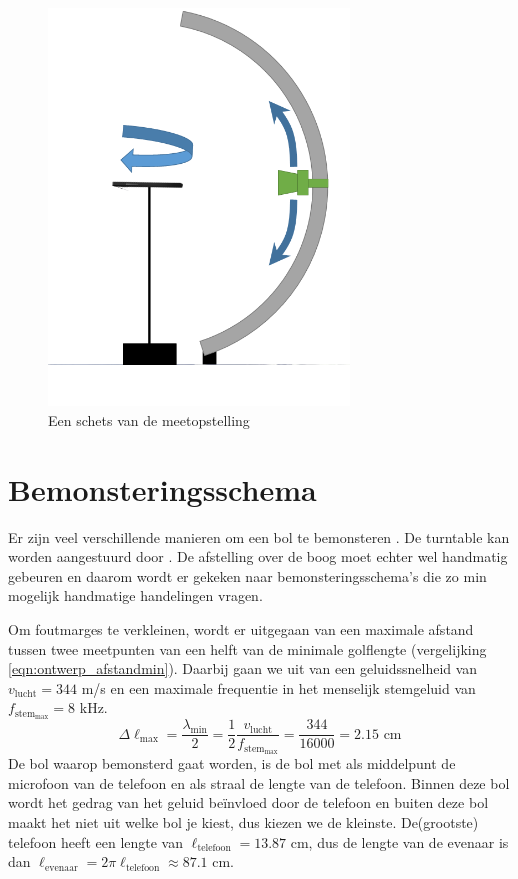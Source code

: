 \begin{figure}[h]
    \centering
    \includegraphics[width=8cm]{afbeeldingen/opstelling_pptx.png}
    \caption{Een schets van de meetopstelling}
    \label{fig:opstelling_pptx}
\end{figure}

\section{Bemonsteringsschema}
Er zijn veel verschillende manieren om een bol te bemonsteren \cite{Zhang2012575}.
De turntable kan worden aangestuurd door \matlab.
De afstelling over de boog moet echter wel handmatig gebeuren en daarom wordt er gekeken naar bemonsteringsschema's die zo min mogelijk handmatige handelingen vragen.

Om foutmarges te verkleinen, wordt er uitgegaan van een maximale afstand tussen twee meetpunten van een helft van de minimale golflengte (vergelijking \ref{eqn:ontwerp_afstandmin}).
Daarbij gaan we uit van een geluidssnelheid van $v_\text{lucht}=344$ m/s en een maximale frequentie in het menselijk stemgeluid van $f_{\text{stem}_\text{max}}=8$ kHz.
\begin{equation}
\label{eqn:ontwerp_afstandmin}
\Delta\ell_\text{max}=\dfrac{\lambda_\text{min}}{2}=\dfrac{1}{2}\dfrac{v_\text{lucht}}{f_{\text{stem}_\text{max}}}=\dfrac{344}{16000}=2.15\text{ cm}
\end{equation}
De bol waarop bemonsterd gaat worden, is de bol met als middelpunt de microfoon van de telefoon en als straal de lengte van de telefoon.
Binnen deze bol wordt het gedrag van het geluid be\"invloed door de telefoon en buiten deze bol maakt het niet uit welke bol je kiest, dus kiezen we de kleinste.
De(grootste) telefoon heeft een lengte van $\ell_\text{telefoon}=13.87$ cm, dus de lengte van de evenaar is dan $\ell_\text{evenaar}=2\pi\ell_\text{telefoon}\approx87.1$ cm.

